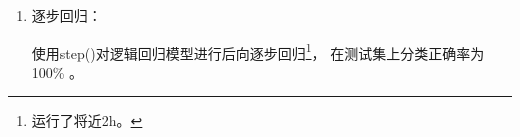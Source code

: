 \documentclass[lang=cn,11pt,a4paper,cite=super]{elegantpaper}
\begin{document}
\begin{enumerate}
   $\sum_{j=1}^{r}\left|\beta_{j}\right| \leq c$ 。问题的正则形式是寻找$\boldsymbol{\beta}$
   最小化
   $$\phi(\boldsymbol{\beta})=(\mathcal{Y}-\mathcal{X} 
   \boldsymbol{\beta})^{\tau}(\mathcal{Y}-\mathcal{X}
    \boldsymbol{\beta})+\lambda \sum_{j=1}^{r}\left|\beta_{j}\right|.~\cite{jiaocai}$$
    使用glmnet包的cv.glmnet()在测试集上通过交叉验证选择合适的参数。将合适的参数代入glmnet()
    获得最终的模型，模型在测试集上分类正确率为100\%\footnote{LASSO的优势在于可以变量选择。
    它在114个自变量（哑变量）中选择了28个用于回归。选出的28个变量涉及到原有22个自变量中的21个。}。
   \item 逐步回归：\par 使用step()对逻辑回归模型进行后向逐步回归\footnote{运行了将近2h。}，
   在测试集上分类正确率为100\% 。
\end{enumerate}
\end{document}
